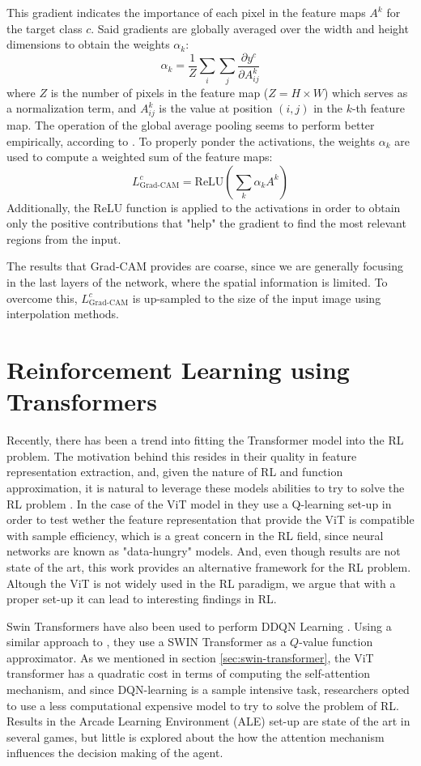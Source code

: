 This gradient indicates the importance of each pixel in the feature maps $A^k$ for the target class $c$. Said gradients are globally averaged over the width and height dimensions to obtain the weights $\alpha_k$:
\[
\alpha_k = \frac{1}{Z} \sum_i \sum_j \frac{\partial y^c}{\partial A_{ij}^k}
\]
where $Z$ is the number of pixels in the feature map ($Z = H \times W$) which serves as a normalization term, and $A_{ij}^k$ is the value at position $(i, j)$ in the $k$-th feature map. The operation of the global average pooling seems to perform better empirically, according to \cite{Selvaraju_2019}. To properly ponder the activations, the weights $\alpha_k$ are used to compute a weighted sum of the feature maps:
\[
L_{\text{Grad-CAM}}^c = \text{ReLU} \left( \sum_k \alpha_k A^k \right)
\]
Additionally, the ReLU function is applied to the activations in order to obtain only the positive contributions that "help" the gradient to find the most relevant regions from the input. 

The results that Grad-CAM provides are coarse, since we are generally focusing in the last layers of the network, where the spatial information is limited. To overcome this, $L_{\text{Grad-CAM}}^c$ is up-sampled to the size of the input image using interpolation methods.


\section{Reinforcement Learning using Transformers}
\label{sec:rl-with-attention}

Recently, there has been a trend into fitting the Transformer model into the RL problem. The motivation behind this resides in their quality in feature representation extraction, and, given the nature of RL and function approximation, it is natural to leverage these models abilities to try to solve the RL problem \cite{rl_transformers2023survey}. In the case of the ViT model in \cite{vit_q_learning_sample_eff} they use a Q-learning set-up in order to test wether the feature representation that provide the ViT is compatible with sample efficiency, which is a great concern in the RL field, since neural networks are known as "data-hungry" models. And, even though results are not state of the art, this work provides an alternative framework for the RL problem. Altough the ViT is not widely used in the RL paradigm, we argue that with a proper set-up it can lead to interesting findings in RL.

Swin Transformers have also been used to perform DDQN Learning \cite{meng2024deep}. Using a similar approach to \cite{vanhasselt2015deep}, they use a SWIN Transformer as a $Q$-value function approximator. As we mentioned in section \ref{sec:swin-transformer}, the ViT transformer has a quadratic cost in terms of computing the self-attention mechanism, and since DQN-learning is a sample intensive task, researchers opted to use a less computational expensive model to try to solve the problem of RL. Results in the Arcade Learning Environment (ALE) \cite{Bellemare_2013} set-up are state of the art in several games, but little is explored about the how the attention mechanism influences the decision making of the agent.

